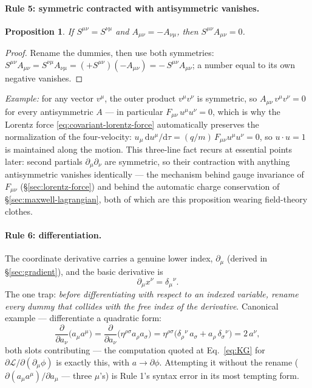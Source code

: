 \documentclass[11pt]{article}
\theoremstyle{plain}
\newtheorem{proposition}[theorem]{Proposition}
\theoremstyle{definition}
\theoremstyle{remark}
\newcommand{\dd}{\mathrm{d}}
\newcommand{\pd}[2]{\frac{\partial #1}{\partial #2}}
\begin{document}
\paragraph{Rule 5: symmetric contracted with antisymmetric vanishes.}
\begin{proposition}\label{prop:sym-antisym}
If $S^{\mu\nu} = S^{\nu\mu}$ and $A_{\mu\nu} = -A_{\nu\mu}$, then
$S^{\mu\nu}A_{\mu\nu} = 0$.
\end{proposition}
\begin{proof}
Rename the dummies, then use both symmetries:
$S^{\mu\nu}A_{\mu\nu} = S^{\nu\mu}A_{\nu\mu}
= (+S^{\mu\nu})(-A_{\mu\nu}) = -\,S^{\mu\nu}A_{\mu\nu}$; a number
equal to its own negative vanishes.
\end{proof}
\noindent
\emph{Example:} for any vector $v^\mu$, the outer product
$v^\mu v^\nu$ is symmetric, so $A_{\mu\nu}\,v^\mu v^\nu = 0$ for
every antisymmetric $A$ --- in particular
$F_{\mu\nu}\,u^\mu u^\nu = 0$, which is why the Lorentz force
\eqref{eq:covariant-lorentz-force} automatically preserves the
normalization of the four-velocity:
$u_\mu\,\dd u^\mu/\dd\tau = (q/m)\,F_{\mu\nu}u^\mu u^\nu = 0$,
so $u \cdot u = 1$ is maintained along the motion.
This three-line fact recurs at essential points later: second partials
$\partial_\mu\partial_\nu$ are symmetric, so their contraction with
anything antisymmetric vanishes identically --- the mechanism behind
gauge invariance of $F_{\mu\nu}$
(\S\ref{sec:lorentz-force}) and behind the automatic charge
conservation of \S\ref{sec:maxwell-lagrangian}, both of which are
this proposition wearing field-theory clothes.

\paragraph{Rule 6: differentiation.} The coordinate derivative
carries a genuine lower index, $\partial_\mu$ (derived in
\S\ref{sec:gradient}), and the basic derivative is
\begin{equation}
  \partial_\mu x^\nu = \delta_\mu{}^\nu .
\end{equation}
The one trap: \emph{before differentiating with respect to an indexed
variable, rename every dummy that collides with the free index of the
derivative}. Canonical example --- differentiate a quadratic form:
\begin{equation}
  \pd{}{a_\nu}\bigl(a_\mu a^\mu\bigr)
  = \pd{}{a_\nu}\bigl(\eta^{\rho\sigma}a_\rho a_\sigma\bigr)
  = \eta^{\rho\sigma}\bigl(
      \delta_\rho{}^\nu\, a_\sigma + a_\rho\,\delta_\sigma{}^\nu
    \bigr)
  = 2\,a^\nu ,
\end{equation}
both slots contributing --- the computation quoted at
Eq.~\eqref{eq:KG} for $\partial\mathcal L/\partial(\partial_\mu\phi)$
is exactly this, with $a \to \partial\phi$. Attempting it without the
rename ($\partial(a_\mu a^\mu)/\partial a_\mu$ --- three $\mu$'s) is
Rule 1's syntax error in its most tempting form.
\end{document}
